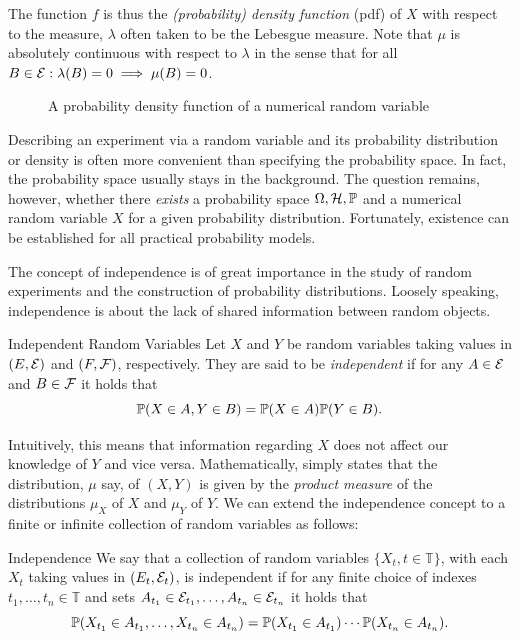 The function \(f\) is thus the \textit{(probability) density function} (pdf) of \(X\) with respect to the measure, \(\lambda\) often taken to be the Lebesgue measure. Note that \(\mu\) is absolutely continuous with respect to \(\lambda\) in the sense that for all \(B \in \mathcal{E}: \lambda(B) = 0 \implies \mu(B) = 0\).
\begin{figure}[H]
	\centering
	
	\caption{A probability density function of a numerical random variable}\label{fig:ProbabilityDensityFunction}
\end{figure}

Describing an experiment via a random variable and its probability distribution or density is often more convenient than specifying the probability space. In fact, the probability space usually stays in the background. The question remains, however, whether there \textit{exists} a probability space \(\Omega, \mathcal{H}, \mathbb{P}\) and a numerical random variable \(X\) for a given probability distribution. Fortunately, existence can be established for all practical probability models.

The concept of independence is of great importance in the study of random experiments and the construction of probability distributions. Loosely speaking, independence is about the lack of shared information between random objects.

\begin{defn}{Independent Random Variables}{}
	Let \(X\) and \(Y\) be random variables taking values in \((E, \mathcal{E})\) and \((F, \mathcal{F})\), respectively. They are said to be \textit{independent} if for any \(A \in \mathcal{E}\) and \(B \in \mathcal{F}\) it holds that
	\begin{equation}
		\mathbb{P}(X \in A, Y \in B) = \mathbb{P}(X \in A) \mathbb{P}(Y \in B).
		\label{eq:IndependentRandomVariablesDef}
	\end{equation}
\end{defn}

Intuitively, this means that information regarding \(X\) does not affect our knowledge of \(Y\) and vice versa. Mathematically,  simply states that the distribution, \(\mu\) say, of \((X,Y)\) is given by the \textit{product measure} of the distributions \(\mu_X\) of \(X\) and \(\mu_Y\) of \(Y\). We can extend the independence concept to a finite or infinite collection of random variables as follows:

\begin{defn}{Independence}{}
	We say that a collection of random variables \(\{X_t, t \in \mathbb{T}\}\), with each \(X_t\) taking values in \((E_t, \mathcal{E}_t)\), is independent if for any finite choice of indexes \(t_1, \dots, t_n \in \mathbb{T}\) and sets \(A_{t_1} \in \mathcal{E}_{t_1}, \dots, A_{t_n} \in \mathcal{E}_{t_n}\) it holds that
	\begin{equation*}
		\mathbb{P}(X_{t_1} \in A_{t_1}, \dots, X_{t_n} \in A_{t_n}) = \mathbb{P}(X_{t_1} \in A_{t_1}) \cdots \mathbb{P}(X_{t_n} \in A_{t_n}).
	\end{equation*}
\end{defn}

